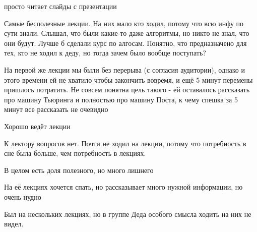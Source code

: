            \begin{commentbox} 
                просто читает слайды с презентации 
            \end{commentbox} 
        
            \begin{commentbox} 
                Самые бесполезные лекции. На них мало кто ходил, потому что всю инфу по сути знали. Слышал, что были какие-то даже алгоритмы, но никто не знал, что они будут. Лучше б сделали курс по алгосам. Понятно, что предназначено для тех, кто не ходил к деду, но тогда зачем было вообще поступать?  
            \end{commentbox} 
        
            \begin{commentbox} 
                На первой же лекции мы были без перерыва (с согласия аудитории), однако и этого времени ей не хватило чтобы закончить вовремя, и ещё 5 минут перемены пришлось потратить. Не совсем понятна цель такого - ей оставалось рассказать про машину Тьюринга и полностью про машину Поста, к чему спешка за 5 минут все рассказать не очевидно
            \end{commentbox} 
        
            \begin{commentbox} 
                Хорошо ведёт лекции 
            \end{commentbox} 
        
            \begin{commentbox} 
                К лектору вопросов нет. Почти не ходил на лекции, потому что потребность в сне была больше, чем потребность в лекциях. 
            \end{commentbox} 
        
            \begin{commentbox} 
                В целом есть доля полезного, но много лишнего 
            \end{commentbox} 
        
            \begin{commentbox} 
                На её лекциях хочется спать, но рассказывает много нужной информации, но очень нудно 
            \end{commentbox} 
        
            \begin{commentbox} 
                Был на нескольких лекциях, но в группе Деда особого смысла ходить на них не видел. 
            \end{commentbox} 
    
